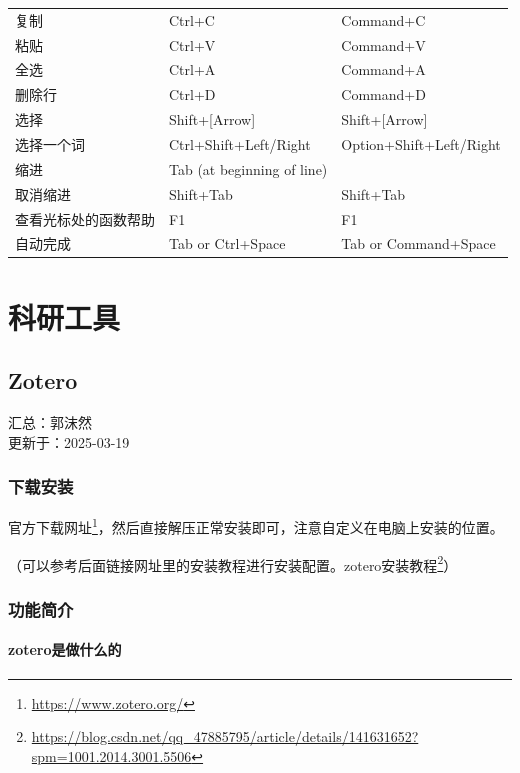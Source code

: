 \documentclass[]{ctexbook}
\renewcommand{\href}[2]{#2\footnote{\url{#1}}}
\theoremstyle{definition}
\theoremstyle{definition}
\theoremstyle{definition}
\theoremstyle{definition}
\theoremstyle{remark}
\begin{document}
\begin{longtable}[]{@{}lll@{}}
复制 & Ctrl+C & Command+C \\
粘贴 & Ctrl+V & Command+V \\
全选 & Ctrl+A & Command+A \\
删除行 & Ctrl+D & Command+D \\
选择 & Shift+{[}Arrow{]} & Shift+{[}Arrow{]} \\
选择一个词 & Ctrl+Shift+Left/Right & Option+Shift+Left/Right \\
缩进 & Tab (at beginning of line) & \\
取消缩进 & Shift+Tab & Shift+Tab \\
查看光标处的函数帮助 & F1 & F1 \\
自动完成 & Tab or Ctrl+Space & Tab or Command+Space \\
\end{longtable}

\part{科研工具}\label{part-ux79d1ux7814ux5de5ux5177}

\chapter{Zotero}\label{zotero}

汇总：郭沫然\\
更新于：2025-03-19

\section{下载安装}\label{ux4e0bux8f7dux5b89ux88c5}

\href{https://www.zotero.org/}{官方下载网址}，然后直接解压正常安装即可，注意自定义在电脑上安装的位置。

（可以参考后面链接网址里的安装教程进行安装配置。\href{https://blog.csdn.net/qq_47885795/article/details/141631652?spm=1001.2014.3001.5506}{zotero安装教程}）

\section{功能简介}\label{ux529fux80fdux7b80ux4ecb}

\subsection{zotero是做什么的}\label{zoteroux662fux505aux4ec0ux4e48ux7684}
\end{document}
